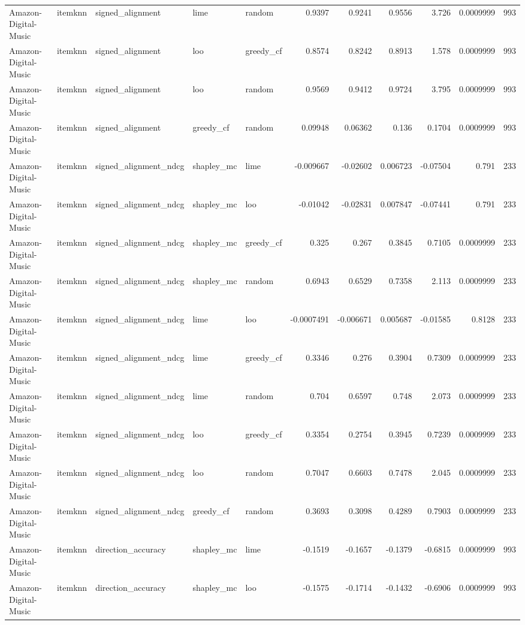 \begin{table}[t]
\begin{tabular}{lllllrrrrrr}
Amazon-Digital-Music & itemknn & signed\_alignment & lime & random & 0.9397 & 0.9241 & 0.9556 & 3.726 & 0.0009999 & 993 \\
Amazon-Digital-Music & itemknn & signed\_alignment & loo & greedy\_cf & 0.8574 & 0.8242 & 0.8913 & 1.578 & 0.0009999 & 993 \\
Amazon-Digital-Music & itemknn & signed\_alignment & loo & random & 0.9569 & 0.9412 & 0.9724 & 3.795 & 0.0009999 & 993 \\
Amazon-Digital-Music & itemknn & signed\_alignment & greedy\_cf & random & 0.09948 & 0.06362 & 0.136 & 0.1704 & 0.0009999 & 993 \\
Amazon-Digital-Music & itemknn & signed\_alignment\_ndcg & shapley\_mc & lime & -0.009667 & -0.02602 & 0.006723 & -0.07504 & 0.791 & 233 \\
Amazon-Digital-Music & itemknn & signed\_alignment\_ndcg & shapley\_mc & loo & -0.01042 & -0.02831 & 0.007847 & -0.07441 & 0.791 & 233 \\
Amazon-Digital-Music & itemknn & signed\_alignment\_ndcg & shapley\_mc & greedy\_cf & 0.325 & 0.267 & 0.3845 & 0.7105 & 0.0009999 & 233 \\
Amazon-Digital-Music & itemknn & signed\_alignment\_ndcg & shapley\_mc & random & 0.6943 & 0.6529 & 0.7358 & 2.113 & 0.0009999 & 233 \\
Amazon-Digital-Music & itemknn & signed\_alignment\_ndcg & lime & loo & -0.0007491 & -0.006671 & 0.005687 & -0.01585 & 0.8128 & 233 \\
Amazon-Digital-Music & itemknn & signed\_alignment\_ndcg & lime & greedy\_cf & 0.3346 & 0.276 & 0.3904 & 0.7309 & 0.0009999 & 233 \\
Amazon-Digital-Music & itemknn & signed\_alignment\_ndcg & lime & random & 0.704 & 0.6597 & 0.748 & 2.073 & 0.0009999 & 233 \\
Amazon-Digital-Music & itemknn & signed\_alignment\_ndcg & loo & greedy\_cf & 0.3354 & 0.2754 & 0.3945 & 0.7239 & 0.0009999 & 233 \\
Amazon-Digital-Music & itemknn & signed\_alignment\_ndcg & loo & random & 0.7047 & 0.6603 & 0.7478 & 2.045 & 0.0009999 & 233 \\
Amazon-Digital-Music & itemknn & signed\_alignment\_ndcg & greedy\_cf & random & 0.3693 & 0.3098 & 0.4289 & 0.7903 & 0.0009999 & 233 \\
Amazon-Digital-Music & itemknn & direction\_accuracy & shapley\_mc & lime & -0.1519 & -0.1657 & -0.1379 & -0.6815 & 0.0009999 & 993 \\
Amazon-Digital-Music & itemknn & direction\_accuracy & shapley\_mc & loo & -0.1575 & -0.1714 & -0.1432 & -0.6906 & 0.0009999 & 993 \\

\end{tabular}
\end{table}
